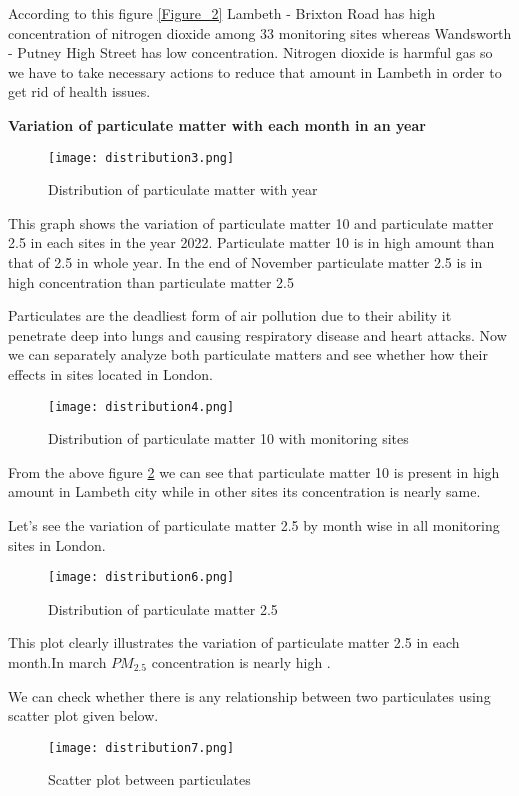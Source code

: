 \documentclass[20pt]{article}
\begin{document}
According to this figure \ref{Figure_2} Lambeth - Brixton Road has high concentration of nitrogen dioxide among 33 monitoring sites whereas Wandsworth - Putney High Street has low concentration. Nitrogen dioxide is harmful gas so we have to take necessary actions to reduce that amount in Lambeth in order to get rid of health issues.

\newpage
\large
\textbf{Variation of particulate matter with each month in an year}
\begin{figure}[h]
	\centering
	\texttt{[image: distribution3.png]}	
	\caption{Distribution of particulate matter with year}
	\label{Figure_3}
\end{figure}

This graph shows the variation of particulate matter 10 and particulate matter 2.5 in each sites in the year 2022. Particulate matter 10 is in high amount than that of 2.5 in whole year. In the end of November particulate matter 2.5 is in high concentration than particulate matter 2.5


\newpage
\large Particulates are the deadliest form of air pollution due to their ability it penetrate deep into lungs and causing respiratory disease and heart attacks.
Now we can separately analyze both particulate matters and see whether how their effects in sites located in London. 

\begin{figure}[h]
	\centering
	\texttt{[image: distribution4.png]}	
	\caption{Distribution of particulate matter 10 with monitoring sites}
	\label{Figure_4}
\end{figure}


From the above figure \ref{Figure_4} we can see that particulate matter 10 is present in high amount in Lambeth city while in other sites its concentration is nearly same.

Let's see the variation of particulate matter 2.5 by month wise in all monitoring sites in London. 

\begin{figure}[h]
	\centering
	\texttt{[image: distribution6.png]}	
	\caption{Distribution of particulate matter 2.5}
	\label{Figure_5}
\end{figure}

This plot clearly illustrates the variation of particulate matter 2.5 in each month.In march $PM_{2.5}$ concentration is nearly high .

\newpage
\large We can check whether there is any relationship between two particulates using  scatter plot given below.
\begin{figure}[h]
	\centering
	\texttt{[image: distribution7.png]}	
	\caption{Scatter plot between particulates}
	\label{Figure_6}
\end{figure}
\end{document}
